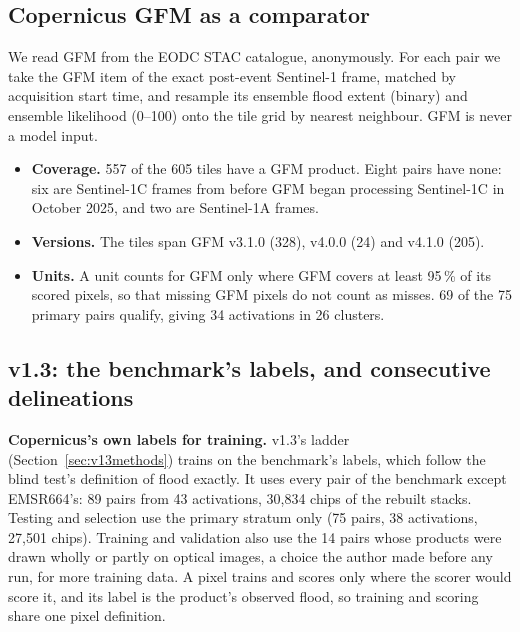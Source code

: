 \documentclass[10pt,twocolumn,a4paper]{article}
\newcommand{\pp}{\,\%}
\begin{document}
\subsection{Copernicus GFM as a comparator}\label{sec:gfmdata}
We read GFM from the EODC STAC catalogue, anonymously.
For each pair we take the GFM item of the exact post-event Sentinel-1 frame, matched by acquisition start time, and
resample its ensemble flood extent (binary) and ensemble likelihood (0--100) onto the tile grid by nearest neighbour.
GFM is never a model input.
\begin{itemize}
  \item \textbf{Coverage.} 557 of the 605 tiles have a GFM product. Eight pairs have none: six are Sentinel-1C frames
    from before GFM began processing Sentinel-1C in October 2025, and two are Sentinel-1A frames.
  \item \textbf{Versions.} The tiles span GFM v3.1.0 (328), v4.0.0 (24) and v4.1.0 (205).
  \item \textbf{Units.} A unit counts for GFM only where GFM covers at least 95\pp{} of its scored pixels, so that missing
    GFM pixels do not count as misses. 69 of the 75 primary pairs qualify, giving 34 activations in 26 clusters.
\end{itemize}

\subsection{v1.3: the benchmark's labels, and consecutive delineations}\label{sec:v13data}
\textbf{Copernicus's own labels for training.} v1.3's ladder (Section~\ref{sec:v13methods}) trains on the
benchmark's labels, which follow the blind test's definition of flood exactly. It uses every pair of the benchmark
except EMSR664's: 89 pairs from 43 activations, 30,834 chips of the rebuilt stacks. Testing and selection use the
primary stratum only (75 pairs, 38 activations, 27,501 chips). Training and validation also use the 14 pairs whose
products were drawn wholly or partly on optical images, a choice the author made before any run, for more training
data. A pixel trains
and scores only where the scorer would score it, and its label is the product's observed flood, so training and
scoring share one pixel definition.
\end{document}
